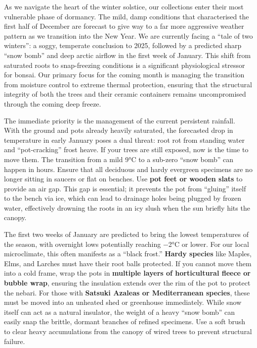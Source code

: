 \label{2025-12-care}
\vfill

\noindent
As we navigate the heart of the winter solstice, our collections enter their most vulnerable phase of dormancy.
The mild, damp conditions that characterised the first half of December are forecast to give way to a far more aggressive weather pattern as we transition into the New Year.
We are currently facing a ``tale of two winters'': a soggy, temperate conclusion to 2025, followed by a predicted sharp ``snow bomb'' and deep arctic airflow in the first week of January.
This shift from saturated roots to snap\--freezing conditions is a significant physiological stressor for bonsai.
Our primary focus for the coming month is managing the transition from moisture control to extreme thermal protection, ensuring that the structural integrity of both the trees and their ceramic containers remains uncompromised through the coming deep freeze.

\medskip
{}
\noindent
The immediate priority is the management of the current persistent rainfall.
With the ground and pots already heavily saturated, the forecasted drop in temperature in early January poses a dual threat: root rot from standing water and ``pot\--cracking'' frost heave.
If your trees are still exposed, now is the time to move them.
The transition from a mild 9°C to a sub\--zero ``snow bomb'' can happen in hours.
Ensure that all deciduous and hardy evergreen specimens are no longer sitting in saucers or flat on benches.
Use \textbf{pot feet or wooden slats} to provide an air gap.
This gap is essential; it prevents the pot from ``gluing'' itself to the bench via ice, which can lead to drainage holes being plugged by frozen water, effectively drowning the roots in an icy slush when the sun briefly hits the canopy.

\medskip
{}
\noindent
The first two weeks of January are predicted to bring the lowest temperatures of the season, with overnight lows potentially reaching −2°C or lower.
For our local microclimate, this often manifests as a ``black frost.'' \textbf{Hardy species} like Maples, Elms, and Larches must have their root balls protected.
If you cannot move them into a cold frame, wrap the pots in \textbf{multiple layers of horticultural fleece or bubble wrap}, ensuring the insulation extends over the rim of the pot to protect the nebari.
For those with \textbf{Satsuki Azaleas or Mediterranean species}, these must be moved into an unheated shed or greenhouse immediately.
While snow itself can act as a natural insulator, the weight of a heavy ``snow bomb'' can easily snap the brittle, dormant branches of refined specimens.
Use a soft brush to clear heavy accumulations from the canopy of wired trees to prevent structural failure.

